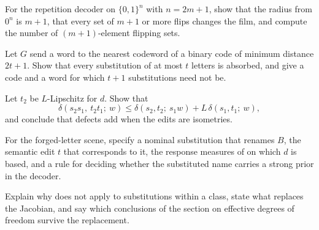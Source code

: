 \begin{exercise}
For the repetition decoder on $\{0,1\}^n$ with $n=2m+1$, show that the radius from $0^n$ is $m+1$, that every set of $m+1$ or more flips changes the film, and compute the number of $(m+1)$-element flipping sets.
\end{exercise}

\begin{exercise}
Let $G$ send a word to the nearest codeword of a binary code of minimum distance $2t+1$. Show that every substitution of at most $t$ letters is absorbed, and give a code and a word for which $t+1$ substitutions need not be.
\end{exercise}

\begin{exercise}\label{ex:defectcomp}
Let $t_2$ be $L$-Lipschitz for $d$. Show that
\[
\delta(s_2s_1,\ t_2t_1;\ w)\le\delta(s_2,t_2;\ s_1w)+L\,\delta(s_1,t_1;\ w),
\]
and conclude that defects add when the edits are isometries.
\end{exercise}

\begin{exercise}
For the forged-letter scene, specify a nominal substitution that renames $B$, the semantic edit $t$ that corresponds to it, the response measures of  on which $d$ is based, and a rule for deciding whether the substituted name carries a strong prior in the decoder.
\end{exercise}

\begin{exercise}
Explain why  does not apply to substitutions within a class, state what replaces the Jacobian, and say which conclusions of the section on effective degrees of freedom survive the replacement.
\end{exercise}
